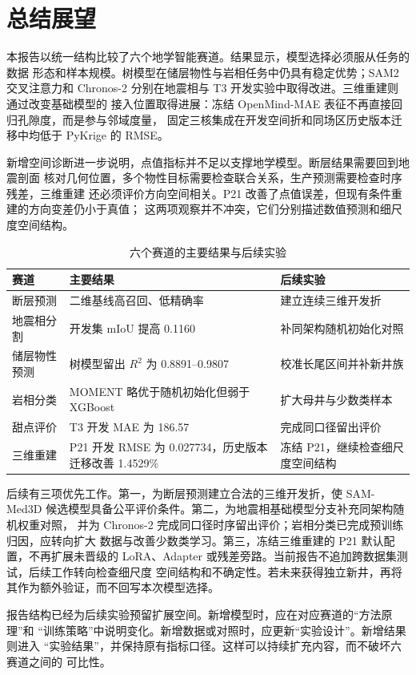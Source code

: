 \chapter{总结展望}

本报告以统一结构比较了六个地学智能赛道。结果显示，模型选择必须服从任务的数据
形态和样本规模。树模型在储层物性与岩相任务中仍具有稳定优势；SAM2 交叉注意力和
Chronos-2 分别在地震相与 T3 开发实验中取得改进。三维重建则通过改变基础模型的
接入位置取得进展：冻结 OpenMind-MAE 表征不再直接回归孔隙度，而是参与邻域度量，
固定三核集成在开发空间折和同场区历史版本迁移中均低于 PyKrige 的 RMSE。

新增空间诊断进一步说明，点值指标并不足以支撑地学模型。断层结果需要回到地震剖面
核对几何位置，多个物性目标需要检查联合关系，生产预测需要检查时序残差，三维重建
还必须评价方向空间相关。P21 改善了点值误差，但现有条件重建的方向变差仍小于真值；
这两项观察并不冲突，它们分别描述数值预测和细尺度空间结构。

\begin{table}[htbp]
  \centering
  \caption{六个赛道的主要结果与后续实验}
  \label{tab:conclusion}
  \small
  \begin{tabularx}{\textwidth}{>{\raggedright\arraybackslash}p{2.50cm}YY}
    \toprule
    赛道 & 主要结果 & 后续实验 \\
    \midrule
    断层预测 & 二维基线高召回、低精确率 & 建立连续三维开发折 \\
    地震相分割 & 开发集 mIoU 提高 0.1160 & 补同架构随机初始化对照 \\
    储层物性预测 & 树模型留出 $R^2$ 为 0.8891--0.9807 & 校准长尾区间并补新井族 \\
    岩相分类 & MOMENT 略优于随机初始化但弱于 XGBoost & 扩大母井与少数类样本 \\
    甜点评价 & T3 开发 MAE 为 186.57 & 完成同口径留出评价 \\
    三维重建 & P21 开发 RMSE 为 0.027734，历史版本迁移改善 1.4529\% & 冻结 P21，继续检查细尺度空间结构 \\
    \bottomrule
  \end{tabularx}
\end{table}

后续有三项优先工作。第一，为断层预测建立合法的三维开发折，使 SAM-Med3D
候选模型具备公平评价条件。第二，为地震相基础模型分支补充同架构随机权重对照，
并为 Chronos-2 完成同口径时序留出评价；岩相分类已完成预训练归因，应转向扩大
数据与改善少数类学习。第三，冻结三维重建的 P21 默认配置，不再扩展未晋级的
LoRA、Adapter 或残差旁路。当前报告不追加跨数据集测试，后续工作转向检查细尺度
空间结构和不确定性。若未来获得独立新井，再将其作为额外验证，而不回写本次模型选择。

报告结构已经为后续实验预留扩展空间。新增模型时，应在对应赛道的“方法原理”和
“训练策略”中说明变化。新增数据或对照时，应更新“实验设计”。新增结果则进入
“实验结果”，并保持原有指标口径。这样可以持续扩充内容，而不破坏六赛道之间的
可比性。
